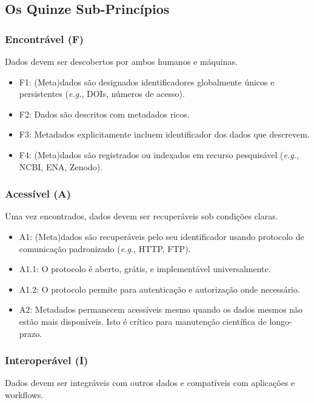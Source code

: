 \subsection{Os Quinze Sub-Princípios}

\subsubsection{Encontrável (F)}

Dados devem ser descobertos por ambos humanos e máquinas.

\begin{itemize}
\item F1: (Meta)dados são designados identificadores globalmente únicos e persistentes (\textit{e.g.}, DOIs, números de acesso).
\item F2: Dados são descritos com metadados ricos.
\item F3: Metadados explicitamente incluem identificador dos dados que descrevem.
\item F4: (Meta)dados são registrados ou indexados em recurso pesquisável (\textit{e.g.}, NCBI, ENA, Zenodo).
\end{itemize}

\subsubsection{Acessível (A)}

Uma vez encontrados, dados devem ser recuperáveis sob condições claras.

\begin{itemize}
\item A1: (Meta)dados são recuperáveis pelo seu identificador usando protocolo de comunicação padronizado (\textit{e.g.}, HTTP, FTP).
\item A1.1: O protocolo é aberto, grátis, e implementável universalmente.
\item A1.2: O protocolo permite para autenticação e autorização onde necessário.
\item A2: Metadados permanecem acessíveis mesmo quando os dados mesmos não estão mais disponíveis. Isto é crítico para manutenção científica de longo-prazo.
\end{itemize}

\subsubsection{Interoperável (I)}

Dados devem ser integráveis com outros dados e compatíveis com aplicações e workflows.

